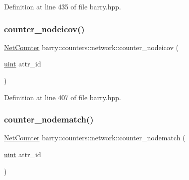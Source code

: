 Definition at line 435 of file barry.\+hpp.

\mbox{\label{namespacebarry_1_1counters_1_1network_aeb0f972d3a2c2ebfcc736edb1f6cb46e}} 
\subsubsection{\texorpdfstring{counter\+\_\+nodeicov()}{counter\_nodeicov()}}
{\footnotesize\ttfamily \hyperlink{namespacebarry_1_1counters_1_1network_a067bd9de04608fc2e1586324d3864a45}{Net\+Counter} barry\+::counters\+::network\+::counter\+\_\+nodeicov (\begin{DoxyParamCaption}\item[{\hyperlink{namespacebarry_a11dfc53ddb4672278319aa04f1e09a6c}{uint}}]{attr\+\_\+id }\end{DoxyParamCaption})\hspace{0.3cm}{\ttfamily [inline]}}



Definition at line 407 of file barry.\+hpp.

\mbox{\label{namespacebarry_1_1counters_1_1network_aca093c21b831f7f775cf9861ef0a5f9d}} 
\subsubsection{\texorpdfstring{counter\+\_\+nodematch()}{counter\_nodematch()}}
{\footnotesize\ttfamily \hyperlink{namespacebarry_1_1counters_1_1network_a067bd9de04608fc2e1586324d3864a45}{Net\+Counter} barry\+::counters\+::network\+::counter\+\_\+nodematch (\begin{DoxyParamCaption}\item[{\hyperlink{namespacebarry_a11dfc53ddb4672278319aa04f1e09a6c}{uint}}]{attr\+\_\+id }\end{DoxyParamCaption})\hspace{0.3cm}{\ttfamily [inline]}}



